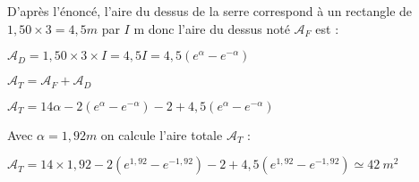 \documentclass{article}
\begin{document}
\vspace{2mm}

\noindent D'après l'énoncé, l'aire du dessus de la serre correspond à un rectangle de $1,50 \times 3 = 4,5 m$ par $I$ m donc l'aire du dessus noté $\mathcal{A}_F$ est :

\vspace{2mm}

$\mathcal{A}_{D} = 1,50 \times 3 \times I = 4,5I = 4,5(e^{\alpha} - e^{-\alpha})$

$\mathcal{A}_{T} = \mathcal{A}_{F} + \mathcal{A}_{D} $

$\mathcal{A}_{T} = 14\alpha - 2(e^{\alpha} - e^{-\alpha}) - 2 + 4,5(e^{\alpha} - e^{-\alpha})$

\vspace{2mm}

\noindent Avec $\alpha = 1,92m$ on calcule l'aire totale  $\mathcal{A}_T$ :

\vspace{2mm}

$\mathcal{A}_{T} = 14 \times 1,92 - 2(e^{1,92} - e^{-1,92}) - 2 + 4,5(e^{1,92} - e^{-1,92}) \simeq 42 \: m^2$
\end{document}
